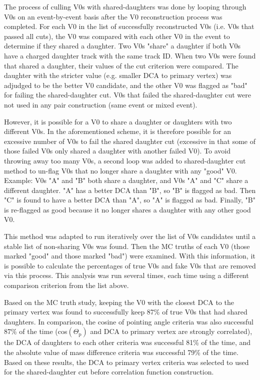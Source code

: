 The process of culling V0s with shared-daughters was done by looping through V0s on an event-by-event basis after the V0 reconstruction process was completed.  For each V0 in the list of successfully reconstructed V0s (i.e. V0s that passed all cuts), the V0 was compared with each other V0 in the event to determine if they shared a daughter.  Two V0s "share" a daughter if both V0s have a charged daughter track with the same track ID.  When two V0s were found that shared a daughter, their values of the cut criterion were compared.  The daughter with the stricter value (e.g. smaller DCA to primary vertex) was adjudged to be the better V0 candidate, and the other V0 was flagged as "bad" for failing the shared-daughter cut.  V0s that failed the shared-daughter cut were not used in any pair construction (same event or mixed event).

However, it is possible for a V0 to share a daughter or daughters with two different V0s. In the aforementioned scheme, it is therefore possible for an excessive number of V0s to fail the shared daughter cut (excessive in that some of those failed V0s only shared a daughter with another failed V0).  To avoid throwing away too many V0s, a second loop was added to shared-daughter cut method to un-flag V0s that no longer share a daughter with any "good" V0. Example: V0s "A" and "B" both share a daughter, and V0s "A" and "C" share a different daughter.  "A" has a better DCA than "B", so "B" is flagged as bad.  Then "C" is found to have a better DCA than "A", so "A" is flagged as bad.  Finally, "B" is re-flagged as good because it no longer shares a daughter with any other good V0.

This method was adapted to run iteratively over the list of V0s candidates until a stable list of non-sharing V0s was found.  Then the MC truths of each V0 (those marked "good" and those marked "bad") were examined.  With this information, it is possible to calculate the percentages of true V0s and fake V0s that are removed via this process.  This analysis was run several times, each time using a different comparison criterion from the list above.

Based on the MC truth study, keeping the V0 with the closest DCA to the primary vertex was found to successfully keep 87\% of true V0s that had shared daughters.  In comparison, the cosine of pointing angle criteria was also successful 87\% of the time (cos$(\Theta_\mathrm{p})$ and DCA to primary vertex are strongly correlated), the DCA of daughters to each other criteria was successful 81\% of the time, and the absolute value of mass difference criteria was successful 79\% of the time.   Based on these results, the DCA to primary vertex criteria was selected to used for the shared-daughter cut before correlation function construction.

